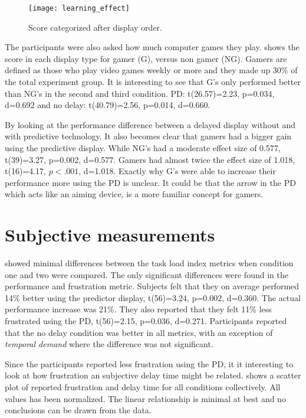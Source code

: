 \begin{figure}[h!]
    \centering
    \texttt{[image: learning\_effect]}
    \caption{Score categorized after display order.}
    \label{learning_effect}
\end{figure}

The participants were also asked how much computer games they play.  shows the score in each display type for gamer (G), versus non gamer (NG). Gamers are defined as those who play video games weekly or more and they made up 30\% of the total experiment group. It is interesting to see that G's only performed better than NG's in the second and third condition. PD: t(26.57)=2.23, p=0.034, d=0.692 and no delay: t(40.79)=2.56, p=0.014, d=0.660.

By looking at the performance difference between a delayed display without and with predictive technology. It also becomes clear that gamers had a bigger gain using the predictive display. While NG's had a moderate effect size of 0.577, t(39)=3.27, p=0.002, d=0.577. Gamers had almost twice the effect size of 1.018, t(16)=4.17, $p<.001$, d=1.018. Exactly why G's were able to increase their performance more using the PD is unclear. It could be that the arrow in the PD which acts like an aiming device, is a more familiar concept for gamers.



\section{Subjective measurements}

 showed minimal differences between the task load index metrics when condition one and two were compared. The only significant differences were found in the performance and frustration metric. Subjects felt that they on average performed 14\% better using the predictor display, t(56)=3.24, p=0.002, d=0.360. The actual performance increase was 21\%. They also reported that they felt 11\% less frustrated using the PD, t(56)=2.15, p=0.036, d=0.271. Participants reported that the no delay condition was better in all metrics, with an exception of \emph{temporal demand} where the difference was not significant.

Since the participants reported less frustration using the PD, it it interesting to look at how frustration an subjective delay time might be related.  shows a scatter plot of reported frustration and delay time for all conditions collectively. All values has been normalized. The linear relationship is minimal at best and no conclusions can be drawn from the data.

